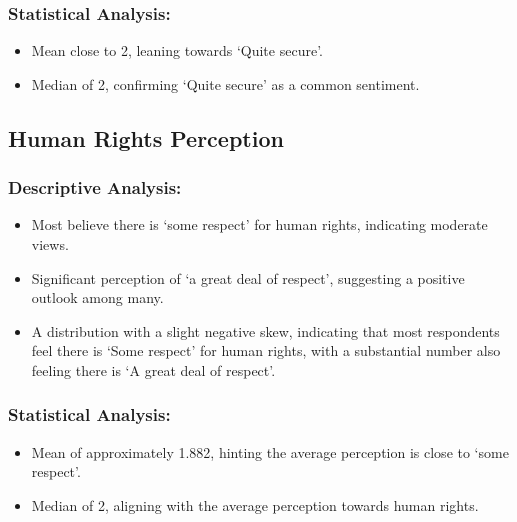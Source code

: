 \documentclass[
]{article}
\providecommand{\tightlist}{%
  \setlength{\itemsep}{0pt}\setlength{\parskip}{0pt}}
\begin{document}
\hypertarget{statistical-analysis-2}{%
\subsubsection{Statistical Analysis:}\label{statistical-analysis-2}}

\begin{itemize}
\tightlist
\item
  Mean close to 2, leaning towards `Quite secure'.
\item
  Median of 2, confirming `Quite secure' as a common sentiment.
\end{itemize}

\hypertarget{human-rights-perception}{%
\subsection{Human Rights Perception}\label{human-rights-perception}}

\hypertarget{descriptive-analysis-3}{%
\subsubsection{Descriptive Analysis:}\label{descriptive-analysis-3}}

\begin{itemize}
\tightlist
\item
  Most believe there is `some respect' for human rights, indicating
  moderate views.
\item
  Significant perception of `a great deal of respect', suggesting a
  positive outlook among many.
\item
  A distribution with a slight negative skew, indicating that most
  respondents feel there is `Some respect' for human rights, with a
  substantial number also feeling there is `A great deal of respect'.
\end{itemize}

\hypertarget{statistical-analysis-3}{%
\subsubsection{Statistical Analysis:}\label{statistical-analysis-3}}

\begin{itemize}
\tightlist
\item
  Mean of approximately 1.882, hinting the average perception is close
  to `some respect'.
\item
  Median of 2, aligning with the average perception towards human
  rights.
\end{itemize}
\end{document}
